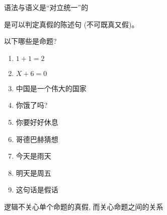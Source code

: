 
\begin{frame}{}
  \begin{center}

    \vspace{0.60cm}
    语法与语义是``对立统一''的
  \end{center}
\end{frame}

\begin{frame}{}
  \begin{definition}[命题 (Proposition)]
    是可以判定真假的陈述句 (不可既真又假)。
  \end{definition}

  \vspace{0.30cm}
  \pause
  \begin{exampleblock}{以下哪些是命题?}
    \begin{enumerate}
      \item $1 + 1 = 2$
      \item $X + 6 = 0$
      \pause
      \item 中国是一个伟大的国家
      \item 你饿了吗?
      \item 你要好好休息
      \pause
      \item 哥德巴赫猜想
      \pause
      \item 今天是雨天
      \item 明天是周五
      \pause
      \item 这句话是假话
    \end{enumerate}
  \end{exampleblock}
\end{frame}

\begin{frame}{}
  \begin{center}

    \vspace{1.00cm}
    逻辑不关心单个命题的真假, 而关心命题之间的关系
  \end{center}
\end{frame}

